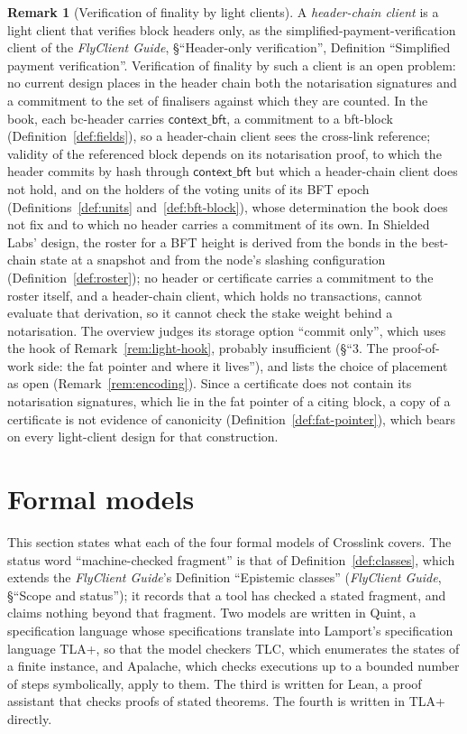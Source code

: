 \documentclass[11pt,a4paper]{article}
\theoremstyle{definition}
\newtheorem{remark}[theorem]{Remark}
\newcommand{\contextbft}{\mathsf{context\_bft}}
\begin{document}
\begin{remark}[Verification of finality by light clients]\label{rem:light-open}
A \emph{header-chain client} is a light client that verifies block headers
only, as the simplified-payment-verification client of the \emph{FlyClient
Guide}, \S``Header-only verification'', Definition ``Simplified payment
verification''. Verification of finality by such a client is an open
problem: no current design places in the header chain both the notarisation
signatures and a commitment to the set of finalisers against which they are
counted. In the book, each bc-header carries $\contextbft$, a commitment to a
bft-block (Definition~\ref{def:fields}), so a header-chain client sees the
cross-link reference; validity of the referenced block depends on its
notarisation proof, to which the header commits by hash through
$\contextbft$ but which a header-chain client does not hold, and on the
holders of the voting units of its BFT epoch (Definitions~\ref{def:units}
and~\ref{def:bft-block}), whose determination the book does not fix and to
which no header carries a commitment of its own. In Shielded Labs' design,
the roster for a BFT height is derived
from the bonds in the best-chain state at a snapshot and from the node's
slashing configuration (Definition~\ref{def:roster}); no header or certificate
carries a commitment to the roster itself, and a header-chain client, which
holds no transactions, cannot evaluate that derivation, so it cannot check the
stake weight behind a notarisation. The overview judges
its storage option ``commit only'', which uses the hook of
Remark~\ref{rem:light-hook}, probably insufficient (\S``3. The
proof-of-work side: the fat pointer and where it lives''), and lists the
choice of placement as open (Remark~\ref{rem:encoding}). Since a
certificate does not contain its notarisation signatures, which lie in the
fat pointer of a citing block, a copy of a certificate is not evidence of
canonicity (Definition~\ref{def:fat-pointer}), which bears on every light-client
design for that construction.
\end{remark}

\section{Formal models}\label{sec:formal}

This section states what each of the four formal models of Crosslink covers.
The status word ``machine-checked fragment'' is that of
Definition~\ref{def:classes}, which extends the \emph{FlyClient Guide}'s
Definition ``Epistemic classes'' (\emph{FlyClient Guide}, \S``Scope and
status''); it records that a tool has checked a stated fragment, and claims
nothing beyond that fragment. Two models are written in Quint, a specification
language whose specifications translate into Lamport's specification language
TLA+, so that the model checkers TLC, which enumerates the states of a finite
instance, and Apalache, which checks executions up to a bounded number of
steps symbolically, apply to them. The third is written for Lean, a proof
assistant that checks proofs of stated theorems. The fourth is written in TLA+
directly.
\end{document}
